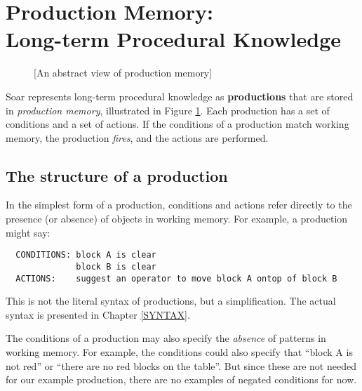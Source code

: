 \section{\texorpdfstring{Production Memory:\\ Long-term Procedural Knowledge}{Production Memory: Long-term Procedural Knowledge}}
\label{ARCH-pm}

\begin{figure}
	[An abstract view of production memory]
	\label{fig:ab-prodmem}
\end{figure}

Soar represents long-term procedural knowledge as \textbf{productions} that are stored in \emph{production memory}, illustrated in Figure \ref{fig:ab-prodmem}. Each production has a set of conditions and a set of actions.  If the conditions of a production match working memory, the production \emph{fires}, and the actions are performed.

\subsection{The structure of a production}
\label{ARCH-pm-structure}

In the simplest form of a production, conditions and actions refer directly to the presence (or absence) of objects in working memory. For example, a production might say:

\begin{verbatim}
  CONDITIONS: block A is clear
              block B is clear
  ACTIONS:    suggest an operator to move block A ontop of block B
\end{verbatim}

This is not the literal syntax of productions, but a simplification. The actual syntax is presented in Chapter \ref{SYNTAX}.

The conditions of a production may also specify the \emph{absence} of patterns in working memory. For example, the conditions could also specify that ``block A is not red'' or ``there are no red blocks on the table''. But since these are not needed for our example production, there are no examples of negated conditions for now.

